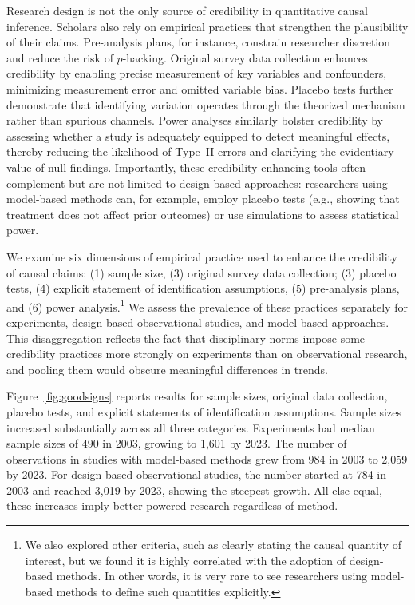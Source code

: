 \documentclass[12pt]{article}
\begin{document}
Research design is not the only source of credibility in quantitative causal inference. Scholars also rely on empirical practices that strengthen the plausibility of their claims. Pre-analysis plans, for instance, constrain researcher discretion and reduce the risk of $p$-hacking. Original survey data collection enhances credibility by enabling precise measurement of key variables and confounders, minimizing measurement error and omitted variable bias. Placebo tests further demonstrate that identifying variation operates through the theorized mechanism rather than spurious channels. Power analyses similarly bolster credibility by assessing whether a study is adequately equipped to detect meaningful effects, thereby reducing the likelihood of Type~II errors and clarifying the evidentiary value of null findings. Importantly, these credibility-enhancing tools often complement but are not limited to design-based approaches: researchers using model-based methods can, for example, employ placebo tests (e.g., showing that treatment does not affect prior outcomes) or use simulations to assess statistical power.

We examine six dimensions of empirical practice used to enhance the credibility of causal claims: (1) sample size, (3) original survey data collection; (3) placebo tests,
(4) explicit statement of identification assumptions, (5) pre-analysis plans, and (6) power analysis.\footnote{We also explored other criteria, such as clearly stating the causal quantity of interest, but we found it is highly correlated with the adoption of design-based methods. In other words, it is very rare to see researchers using model-based methods to define such quantities explicitly.} We assess the prevalence of these practices separately for experiments, design-based observational studies, and model-based approaches. This disaggregation reflects the fact that disciplinary norms impose some credibility practices more strongly on experiments than on observational research, and pooling them would obscure meaningful differences in trends.

Figure~\ref{fig:goodsigns} reports results for sample sizes, original data collection, placebo tests, and explicit statements of identification assumptions. Sample sizes increased substantially across all three categories. Experiments had median sample sizes of 490 in 2003, growing to 1,601 by 2023. The number of observations in studies with model-based methods grew from 984 in 2003 to 2,059 by 2023. For design-based observational studies, the number started at 784 in 2003 and reached 3,019 by 2023, showing the steepest growth. All else equal, these increases imply better-powered research regardless of method.
\end{document}
